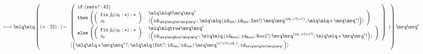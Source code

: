 \documentclass{article}
\begin{document}
\begin{align*}
\longmapsto &\;\quot{\left(\left(+\cdot 22\right)\cdot (\sim \begin{array}{l}\left(\begin{array}{l}\mathtt{if}\,\left(\mathtt{zero?}\cdot 42\right)\\\mathtt{then}\,\left(\left(\begin{array}{l} \mathtt{fix}\; \mathit{f}_{0}(\mathit{x}_{0}:\star): \star\\\mathit{x}_{0}\end{array}\right)\cdot \begin{array}{l}\quot{0}^{\varepsilon}\\\langle\left(\mathtt{id}_{\quot{\mathtt{Int}}^{\varepsilon}};\quot{\left(\mathtt{id}_{\mathtt{Int}};\mathtt{id}_{\mathtt{Int}};\mathtt{Int}!\right)}^{\left(\mathtt{id}_{\varepsilon};\varepsilon \uparrow \varepsilon;\varepsilon!\right)};\quot{\star}^{\star}!\right)\rangle\end{array}\right)\\\mathtt{else}\,\left(\left(\begin{array}{l} \mathtt{fix}\; \mathit{f}_{0}(\mathit{x}_{0}:\star): \star\\\mathit{x}_{0}\end{array}\right)\cdot \begin{array}{l}\quot{\mathtt{true}}^{\varepsilon}\\\langle\left(\mathtt{id}_{\quot{\mathtt{Bool}}^{\varepsilon}};\quot{\left(\mathtt{id}_{\mathtt{Bool}};\mathtt{id}_{\mathtt{Bool}};\mathtt{Bool}!\right)}^{\left(\mathtt{id}_{\varepsilon};\varepsilon \uparrow \varepsilon;\varepsilon!\right)};\quot{\star}^{\star}!\right)\rangle\end{array}\right)\end{array}\right)\\\langle\left(\quot{\star}^{\star}?;\quot{\left(\mathtt{Int}?;\mathtt{id}_{\mathtt{Int}};\mathtt{id}_{\mathtt{Int}}\right)}^{\left(\varepsilon?;\varepsilon \uparrow \varepsilon;\mathtt{id}_{\varepsilon}\right)};\mathtt{id}_{\quot{\mathtt{Int}}^{\varepsilon}}\right)\rangle\end{array})\right)}^{\varepsilon}\\ 

\end{align*}
\end{document}
